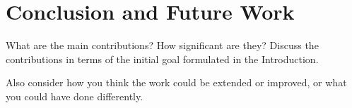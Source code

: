 \section{Conclusion and Future Work}
\label{sec:Conclusion}

What are the main contributions? How significant are they?
Discuss the contributions in terms of the initial goal formulated in the Introduction. 

Also consider how you think the work could be extended or improved, or what you could have done differently.
